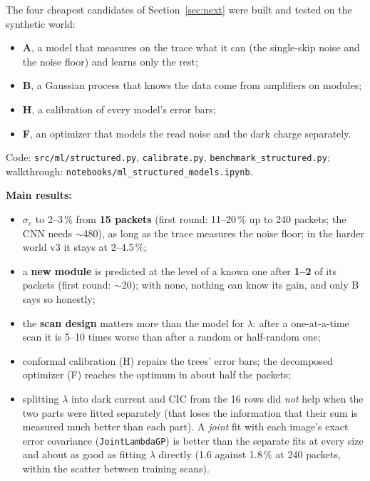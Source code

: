 \documentclass[10pt]{article}
\newcommand{\code}[1]{\texttt{#1}}
\begin{document}
\begin{basic}
The four cheapest candidates of Section~\ref{sec:next} were built and tested on the synthetic world:
\begin{itemize}
\item \textbf{A}, a model that measures on the trace what it can (the single-skip noise and the noise floor) and learns only the rest;
\item \textbf{B}, a Gaussian process that knows the data come from amplifiers on modules;
\item \textbf{H}, a calibration of every model's error bars;
\item \textbf{F}, an optimizer that models the read noise and the dark charge separately.
\end{itemize}
{\raggedright Code: \code{src/ml/structured.py}, \code{calibrate.py}, \code{benchmark\_structured.py}; walkthrough:
\code{notebooks/ml\_structured\_models.ipynb}.\par}

\textbf{Main results:}
\begin{itemize}
\item $\sigma_e$ to 2--3\,\% from \textbf{15 packets} (first round: 11--20\,\% up to 240 packets; the CNN needs $\sim$480), as long as the trace
  measures the noise floor; in the harder world v3 it stays at 2--4.5\,\%;
\item a \textbf{new module} is predicted at the level of a known one after \textbf{1--2} of its packets (first round: $\sim$20); with none,
  nothing can know its gain, and only B says so honestly;
\item the \textbf{scan design} matters more than the model for $\lambda$: after a one-at-a-time scan it is 5--10 times worse than after a
  random or half-random one;
\item conformal calibration (H) repairs the trees' error bars; the decomposed optimizer (F) reaches the optimum in about half the packets;
\item splitting $\lambda$ into dark current and CIC from the 16 rows did \emph{not} help when the two parts were fitted separately
  (that loses the information that their sum is measured much better than each part). A \emph{joint} fit with each image's exact
  error covariance (\code{JointLambdaGP}) is better than the separate fits at every size and about as good as fitting $\lambda$
  directly (1.6 against 1.8\,\% at 240 packets, within the scatter between training scans).
\end{itemize}
\end{basic}
\end{document}
